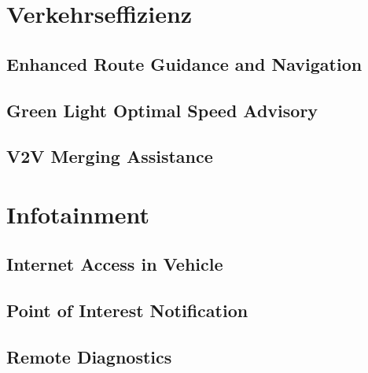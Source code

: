 \section{Verkehrseffizienz}
\subsection{Enhanced Route Guidance and Navigation}
\subsection{Green Light Optimal Speed Advisory}
\subsection{V2V Merging Assistance}

\section{Infotainment}
\subsection{Internet Access in Vehicle}
\subsection{Point of Interest Notification}
\subsection{Remote Diagnostics}